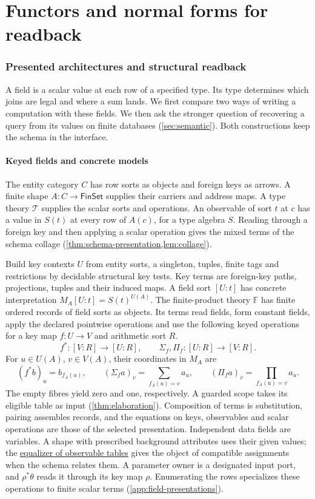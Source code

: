 \documentclass[11pt,a4paper]{article}
\theoremstyle{definition}
\theoremstyle{remark}\newaliascnt{remark}{theorem}
\numberwithin{equation}{section}
\begin{document}
\part{Functors and normal forms for readback}\label{part:functors}

\section{Presented architectures and structural readback}\label{sec:compiler}
A field is a scalar value at each row of a specified type. Its type determines which joins are legal and where a sum lands. We first compare two ways of writing a computation with these fields. We then ask the stronger question of recovering a query from its values on finite databases (\cref{sec:semantic}). Both constructions keep the schema in the interface.

\subsection{Keyed fields and concrete models}\label{sec:field-language}
The entity category \(C\) has row sorts as objects and foreign keys as arrows. A finite shape \(A:C\to\mathsf{FinSet}\) supplies their carriers and address maps. A type theory \(\mathcal T\) supplies the scalar sorts and operations. An observable of sort \(t\) at \(c\) has a value in \(S(t)\) at every row of \(A(c)\), for a type algebra \(S\). Reading through a foreign key and then applying a scalar operation gives the mixed terms of the schema collage (\cref{thm:schema-presentation,lem:collage}).

Build key contexts \(U\) from entity sorts, a singleton, tuples, finite tags and restrictions by decidable structural key tests. Key terms are foreign-key paths, projections, tuples and their induced maps. A field sort \([U:t]\) has concrete interpretation \(M_A[U:t]=S(t)^{U(A)}\). The finite-product theory \(\mathbb F\) has finite ordered records of field sorts as objects. Its terms read fields, form constant fields, apply the declared pointwise operations and use the following keyed operations for a key map \(f:U\to V\) and arithmetic sort \(R\).
\[
 f^*:[V:R]\to[U:R],\qquad
 \Sigma_f,\Pi_f:[U:R]\to[V:R].
\]
For \(u\in U(A)\), \(v\in V(A)\), their coordinates in \(M_A\) are
\[
 (f^*b)_u=b_{f_A(u)},\qquad
 (\Sigma_f a)_v=\sum_{f_A(u)=v}a_u,\qquad
 (\Pi_f a)_v=\prod_{f_A(u)=v}a_u .
\]
The empty fibres yield zero and one, respectively. A guarded scope takes its eligible table as input (\cref{thm:elaboration}). Composition of terms is substitution, pairing assembles records, and the equations on keys, observables and scalar operations are those of the selected presentation. Independent data fields are variables. A shape with prescribed background attributes uses their given values; the \hyperref[sec:legal-attribute-tables]{equalizer of observable tables} gives the object of compatible assignments when the schema relates them. A parameter owner is a designated input port, and \(\rho^*\theta\) reads it through its key map \(\rho\). Enumerating the rows specializes these operations to finite scalar terms (\cref{app:field-presentations}).
\end{document}
